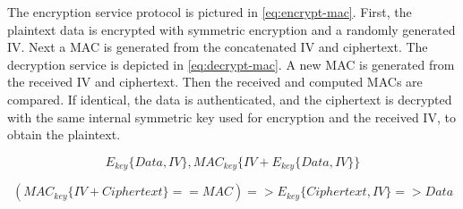 The encryption service protocol is pictured in \ref{eq:encrypt-mac}.
First, the plaintext data is encrypted with symmetric encryption and a randomly generated \ac{IV}. Next a \ac{MAC} is generated from the concatenated \ac{IV} and ciphertext.
The decryption service is depicted in \ref{eq:decrypt-mac}.
A new \ac{MAC} is generated from the received \ac{IV} and ciphertext. Then the received and computed MACs are compared. If identical, the data is authenticated, and the ciphertext is decrypted with the same internal symmetric key used for encryption and the received \ac{IV}, to obtain the plaintext.

\begin{equation}
	\label{eq:encrypt-mac}
	E_{key}\{Data, IV\}, MAC_{key}\{IV+E_{key}\{Data, IV\}\}
\end{equation}

\begin{equation}
	\label{eq:decrypt-mac}
	(MAC_{key}\{IV+Ciphertext\} == MAC) => E_{key}\{Ciphertext, IV\} => Data
\end{equation}






